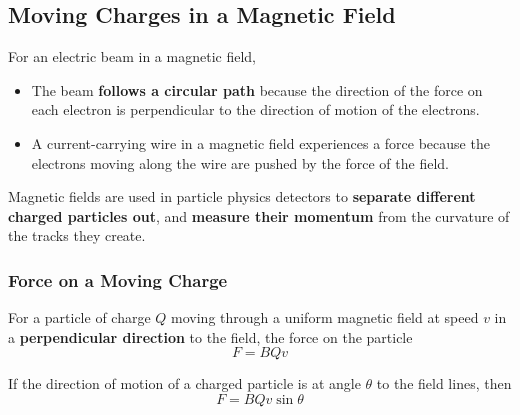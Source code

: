 \subsection{Moving Charges in a Magnetic Field}

For an electric beam in a magnetic field,
\begin{itemize}
    \item The beam \textbf{follows a circular path} because the direction of the force on each electron is perpendicular to the direction of motion of the electrons.
    \item A current-carrying wire in a magnetic field experiences a force because the electrons moving along the wire are pushed by the force of the field.
\end{itemize}

Magnetic fields are used in particle physics detectors to \textbf{separate different charged particles out}, and \textbf{measure their momentum} from the curvature of the tracks they create.

\subsubsection*{Force on a Moving Charge}

For a particle of charge $Q$ moving through a uniform magnetic field at speed $v$ in a \textbf{perpendicular direction} to the field, the force on the particle
$$F=BQv$$

If the direction of motion of a charged particle is at angle $\theta$ to the field lines, then
$$F=BQv\sin\theta$$
